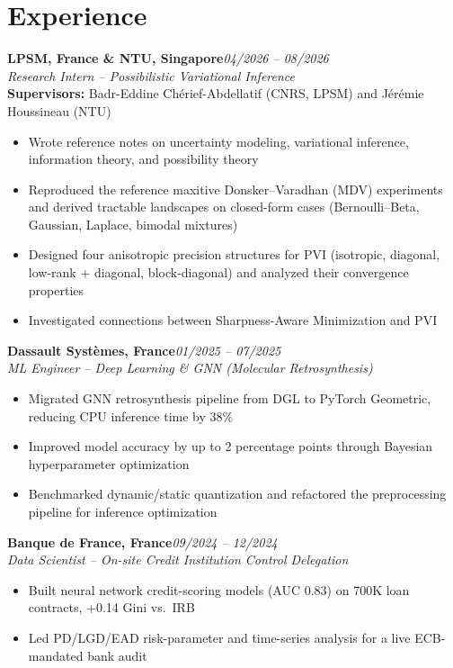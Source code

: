 \documentclass[11pt,a4paper]{article}
\newlength{\entrygap}      \setlength{\entrygap}{4pt}
\newlength{\subentrygap}   \setlength{\subentrygap}{2.5pt}
\newcommand{\cventry}[3]{%
  \noindent\textbf{#1}\hfill\textit{#2}\\
  \textit{#3}%
}
\newcommand{\entrysep}{\vspace{\entrygap}}
\newcommand{\bulletsep}{\vspace{\subentrygap}}
\begin{document}
\section*{Experience}

\cventry{LPSM, France \& NTU, Singapore}{04/2026 -- 08/2026}{Research Intern -- Possibilistic Variational Inference}\\
\textbf{Supervisors:} Badr-Eddine Ch\'erief-Abdellatif (CNRS, LPSM) and J\'er\'emie Houssineau (NTU)
\bulletsep
\begin{itemize}
  \item Wrote reference notes on uncertainty modeling, variational inference, information theory, and possibility theory
  \item Reproduced the reference maxitive Donsker--Varadhan (MDV) experiments and derived tractable landscapes on closed-form cases (Bernoulli--Beta, Gaussian, Laplace, bimodal mixtures)
  \item Designed four anisotropic precision structures for PVI (isotropic, diagonal, low-rank + diagonal, block-diagonal) and analyzed their convergence properties
  \item Investigated connections between Sharpness-Aware Minimization and PVI
\end{itemize}
\entrysep

\cventry{Dassault Syst\`emes, France}{01/2025 -- 07/2025}{ML Engineer -- Deep Learning \& GNN (Molecular Retrosynthesis)}
\bulletsep
\begin{itemize}
  \item Migrated GNN retrosynthesis pipeline from DGL to PyTorch Geometric, reducing CPU inference time by 38\%
  \item Improved model accuracy by up to 2 percentage points through Bayesian hyperparameter optimization
  \item Benchmarked dynamic/static quantization and refactored the preprocessing pipeline for inference optimization
\end{itemize}
\entrysep

\cventry{Banque de France, France}{09/2024 -- 12/2024}{Data Scientist -- On-site Credit Institution Control Delegation}
\bulletsep
\begin{itemize}
  \item Built neural network credit-scoring models (AUC 0.83) on 700K loan contracts, +0.14 Gini vs.\ IRB
  \item Led PD/LGD/EAD risk-parameter and time-series analysis for a live ECB-mandated bank audit
\end{itemize}
\end{document}
